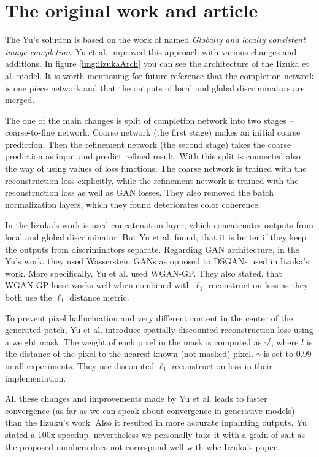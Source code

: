 \documentclass[a4paper, 11pt]{article}
\begin{document}
\section{The original work and article}
\label{section:origin}
The Yu's \cite{Yu} solution is based on the work of \cite{Iizuka} named \textit{Globally and
locally consistent image completion}. Yu et al. improved this approach with various changes and additions. 
In figure \ref{img:iizukaArch} you can see the architecture of the Iizuka et al. model. It is worth mentioning for future reference that the completion network is one piece network and that the outputs of local and global discriminators are merged.

The one of the main changes is split of completion network into two stages -- coarse-to-fine network. Coarse network (the first stage) makes an initial coarse prediction. Then the refinement network (the second stage) takes the coarse prediction as input and predict refined result. With this split is connected also the way of using values of loss functions.
The coarse network is trained with the reconstruction loss explicitly, while the refinement network is trained with the reconstruction loss as well as GAN losses. They also removed the batch normalization layers, which they found deteriorates color coherence.

In the Iizuka's \cite{Iizuka} work is used concatenation layer, which concatenates outputs from local and global discriminator. But Yu et al. found, that it is better if they keep the outputs from discriminators separate. Regarding GAN architecture, in the Yu's work, they used Wasserstein GANs as opposed to DSGANs used in Iizuka's work. More specifically, Yu et al. used WGAN-GP. They also stated. that WGAN-GP losse works well when combined with $\ell_1$
reconstruction loss as they both use the $\ell_1$ distance metric.

To prevent pixel hallucination and very different content in the center of the generated patch, Yu et al. introduce spatially discounted reconstruction loss using a weight mask. 
The weight of each pixel in the mask is computed as $\gamma^l$, where $l$ is the distance of the pixel to the nearest known (not masked) pixel. $\gamma$ is set to 0.99 in all experiments. They use
discounted $\ell_1$ reconstruction loss in their implementation.

All these changes and improvements made by Yu et al. leads to faster convergence (as far as we can speak about convergence in generative models) than the Iizuku's work. Also it resulted in more accurate inpainting outputs. Yu stated a 100x speedup, nevertheless we personally take it with a grain of salt as the proposed numbers does not correspond well with whe Iizuka's paper.
\end{document}
